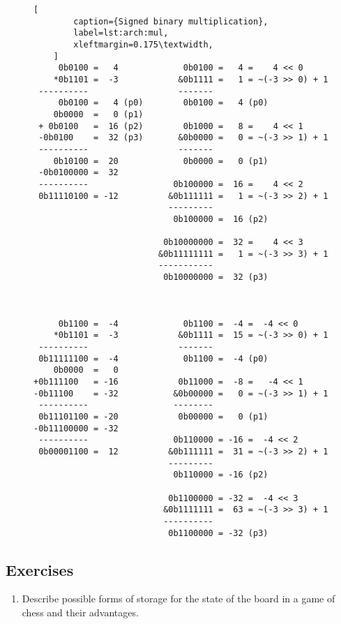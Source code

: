 \begin{figure}[p]
    \begin{lstlisting}[
        caption={Signed binary multiplication},
        label=lst:arch:mul,
        xleftmargin=0.175\textwidth,
    ]
     0b0100 =   4             0b0100 =   4 =    4 << 0
    *0b1101 =  -3            &0b1111 =   1 = ~(-3 >> 0) + 1
 ----------                  -------
     0b0100 =   4 (p0)        0b0100 =   4 (p0)
    0b0000  =   0 (p1)
 + 0b0100   =  16 (p2)        0b1000 =   8 =    4 << 1
 -0b0100    =  32 (p3)       &0b0000 =   0 = ~(-3 >> 1) + 1
 ----------                  -------
    0b10100 =  20             0b0000 =   0 (p1)
 -0b0100000 =  32
 ----------                 0b100000 =  16 =    4 << 2
 0b11110100 = -12          &0b111111 =   1 = ~(-3 >> 2) + 1
                           ---------
                            0b100000 =  16 (p2)

                          0b10000000 =  32 =    4 << 3
                         &0b11111111 =   1 = ~(-3 >> 3) + 1
                         -----------
                          0b10000000 =  32 (p3)



     0b1100 =  -4             0b1100 =  -4 =  -4 << 0
    *0b1101 =  -3            &0b1111 =  15 = ~(-3 >> 0) + 1
 ----------                  -------
 0b11111100 =  -4             0b1100 =  -4 (p0)
    0b0000  =   0
+0b111100   = -16            0b11000 =  -8 =   -4 << 1
-0b11100    = -32           &0b00000 =   0 = ~(-3 >> 1) + 1
 ----------                 --------
 0b11101100 = -20            0b00000 =   0 (p1)
-0b11100000 = -32
 ----------                 0b110000 = -16 =  -4 << 2
 0b00001100 =  12          &0b111111 =  31 = ~(-3 >> 2) + 1
                           ---------
                            0b110000 = -16 (p2)

                           0b1100000 = -32 =  -4 << 3
                          &0b1111111 =  63 = ~(-3 >> 3) + 1
                          ----------
                           0b1100000 = -32 (p3)
    \end{lstlisting}
\end{figure}

\subsection{Exercises}

\begin{enumerate}[label*=\arabic*.]
    \item
        \label{ex:arch:chess}
        Describe possible forms of storage for the state of the board in a game
        of chess and their advantages.
\end{enumerate}
